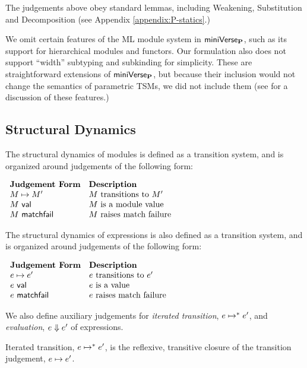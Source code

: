 The judgements above obey standard lemmas, including Weakening, Substitution and Decomposition (see Appendix \ref{appendix:P-statics}.)

We omit certain features of the ML module system in  $\mathsf{miniVerse}_\textbf{P}$, such as its support for hierarchical modules and functors. Our formulation also does not support ``width'' subtyping and subkinding for simplicity. These are straightforward extensions of $\mathsf{miniVerse}_\textbf{P}$, but because their inclusion would not change the semantics of parametric TSMs, we did not include them (see \cite{pfpl} for a discussion of these features.)

\subsection{Structural Dynamics}
The structural dynamics of modules is defined as a transition system, and is organized around judgements of the following form:

\vspace{10px}
$\begin{array}{ll}
\textbf{Judgement Form} & \textbf{Description}\\
M \mapsto M' & \text{$M$ transitions to $M'$}\\
M~\mathsf{val} & \text{$M$ is a module value}\\
M~\mathsf{matchfail} & \text{$M$ raises match failure}
\end{array}$
\vspace{10px}

The structural dynamics of expressions is also defined as a transition system, and is organized around judgements of the following form:

\vspace{10px}
$\begin{array}{ll}
\textbf{Judgement Form} & \textbf{Description}\\
e \mapsto e' & \text{$e$ transitions to $e'$}\\
e~\mathsf{val} & \text{$e$ is a value}\\
e~\mathsf{matchfail} & \text{$e$ raises match failure}
\end{array}$
\vspace{10px}

We also define auxiliary judgements for \emph{iterated transition}, $e \mapsto^{*} e'$, and \emph{evaluation}, $e \Downarrow e'$ of expressions.

\begingroup
\def\thetheorem{\ref{defn:iterated-transition-P}}
\begin{definition} Iterated transition, $e \mapsto^{*} e'$, is the reflexive, transitive closure of the transition judgement, $e \mapsto e'$.\end{definition}
\endgroup

